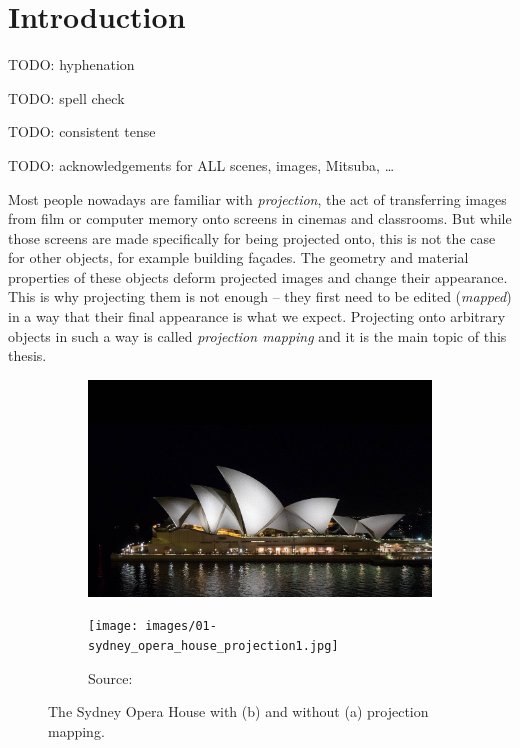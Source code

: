 \chapter{Introduction}
\label{chapter:intro}

{\color{red} TODO: hyphenation}

{\color{red} TODO: spell check}

{\color{red} TODO: consistent tense}

{\color{red} TODO: acknowledgements for ALL scenes, images, Mitsuba, \dots}

Most people nowadays are familiar with \textit{projection}, the act of transferring images from film or computer memory onto screens in cinemas and classrooms. But while those screens are made specifically for being projected onto, this is not the case for other objects, for example building façades. The geometry and material properties of these objects deform projected images and change their appearance. This is why projecting them is not enough -- they first need to be edited (\textit{mapped}) in a way that their final appearance is what we expect. Projecting onto arbitrary objects in such a way is called \textit{projection mapping} and it is the main topic of this thesis.

\begin{figure}[ht]
    \centering
    \begin{subfigure}[b]{0.49\textwidth}
        \centering
        \includegraphics[width=\textwidth]{images/01-sydney_opera_house_night-edit.jpg}
        \caption{}
    \end{subfigure}
    \hfill
    \begin{subfigure}[b]{0.49\textwidth}
        \centering
        \texttt{[image: images/01-sydney\_opera\_house\_projection1.jpg]}
        \caption{Source: \citet{ImageProjectionMappingExampleSydney}}
    \end{subfigure}
    \caption{The Sydney Opera House with (b) and without (a) projection mapping.}
    \label{fig:intro_example_sydney}
\end{figure}

